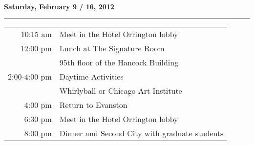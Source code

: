 \documentclass{article}
\begin{document}
\vspace*{1.5\baselineskip}
\centerline{\textbf{Saturday, February 9 / 16, 2012}}
\vspace*{0.25\baselineskip}
\hrule
\vspace*{0.25\baselineskip}

\hspace{5cm}
\begin{tabular}{ r    l }

10:15 am        & Meet in the Hotel Orrington lobby \rule{0cm}{0.6cm} \\ 

12:00 pm        & Lunch at The Signature Room \rule{0cm}{0.4cm} \\ 
                & \hspace{5mm} 95th floor of the Hancock Building \rule{0cm}{0.4cm} \\ 

2:00-4:00 pm    & Daytime Activities \rule{0cm}{0.4cm} \\ 
                & \hspace{5mm} Whirlyball or Chicago Art Institute \\ 

4:00 pm         & Return to Evanston \rule{0cm}{0.4cm} \\ 

6:30 pm         & Meet in the Hotel Orrington lobby \rule{0cm}{0.4cm} \\ 

8:00 pm         & Dinner and Second City with graduate students \rule{0cm}{0.4cm} \\

\end{tabular}
\end{document}
